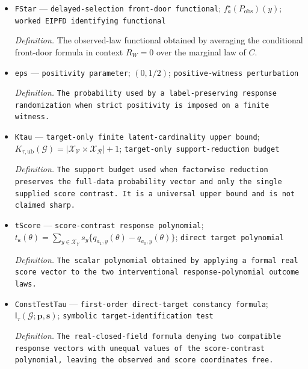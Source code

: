 \documentclass{article}
\begin{document}
\begin{itemize}
  \par\smallskip\noindent\emph{Definition.} The member with one logistics parent \(C\to R_W\), one mediator \(A\to B_1\to Y\), the Figure 3(b) edges and proxy mechanism, and the added edge \(A\leftrightarrow Y\).
  \item \texttt{FStar} --- \texttt{delayed-\allowbreak{}selection front-\allowbreak{}door functional}; \(f_a^\star(P_{\mathrm{obs}})(y)\); \texttt{worked EIPFD identifying functional}
  \par\smallskip\noindent\emph{Definition.} The observed-law functional obtained by averaging the conditional front-door formula in context \(R_W=0\) over the marginal law of \(C\).
  \item \texttt{eps} --- \texttt{positivity parameter}; \((0,1/2)\); \texttt{positive-\allowbreak{}witness perturbation}
  \par\smallskip\noindent\emph{Definition.} \texttt{The probability used by a label-\allowbreak{}preserving response randomization when strict positivity is imposed on a finite witness.}
  \item \texttt{Ktau} --- \texttt{target-\allowbreak{}only finite latent-\allowbreak{}cardinality upper bound}; \(K_{\tau,\mathrm{ub}}(\mathcal G)=|\mathcal X_{\mathcal V}\times\mathcal X_{\mathcal R}|+1\); \texttt{target-\allowbreak{}only support-\allowbreak{}reduction budget}
  \par\smallskip\noindent\emph{Definition.} \texttt{The support budget used when factorwise reduction preserves the full-\allowbreak{}data probability vector and only the single supplied score contrast. It is a universal upper bound and is not claimed sharp.}
  \item \texttt{tScore} --- \texttt{score-\allowbreak{}contrast response polynomial}; \(t_{\mathbf s}(\theta)=\sum_{y\in\mathcal X_Y}s_y\{q_{a_1,y}(\theta)-q_{a_0,y}(\theta)\}\); \texttt{direct target polynomial}
  \par\smallskip\noindent\emph{Definition.} \texttt{The scalar polynomial obtained by applying a formal real score vector to the two interventional response-\allowbreak{}polynomial outcome laws.}
  \item \texttt{ConstTestTau} --- \texttt{first-\allowbreak{}order direct-\allowbreak{}target constancy formula}; \(\mathsf I_{\tau}(\mathcal G;\mathbf p,\mathbf s)\); \texttt{symbolic target-\allowbreak{}identification test}
  \par\smallskip\noindent\emph{Definition.} \texttt{The real-\allowbreak{}closed-\allowbreak{}field formula denying two compatible response vectors with unequal values of the score-\allowbreak{}contrast polynomial,\allowbreak{} leaving the observed and score coordinates free.}

\end{itemize}
\end{document}
